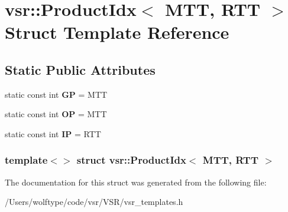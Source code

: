 \hypertarget{structvsr_1_1_product_idx_3_01_m_t_t_00_01_r_t_t_01_4}{\section{vsr\-:\-:Product\-Idx$<$ M\-T\-T, R\-T\-T $>$ Struct Template Reference}
\label{structvsr_1_1_product_idx_3_01_m_t_t_00_01_r_t_t_01_4}
}
\subsection*{Static Public Attributes}
\begin{DoxyCompactItemize}
\item 
\hypertarget{structvsr_1_1_product_idx_3_01_m_t_t_00_01_r_t_t_01_4_a96b1476a5137fb033fc050fc941b9f05}{static const int {\bfseries G\-P} = M\-T\-T}\label{structvsr_1_1_product_idx_3_01_m_t_t_00_01_r_t_t_01_4_a96b1476a5137fb033fc050fc941b9f05}

\item 
\hypertarget{structvsr_1_1_product_idx_3_01_m_t_t_00_01_r_t_t_01_4_a788326f3a55ff19b4fe8712c984b3bfd}{static const int {\bfseries O\-P} = M\-T\-T}\label{structvsr_1_1_product_idx_3_01_m_t_t_00_01_r_t_t_01_4_a788326f3a55ff19b4fe8712c984b3bfd}

\item 
\hypertarget{structvsr_1_1_product_idx_3_01_m_t_t_00_01_r_t_t_01_4_a2b36a0864453a645934032318d22d9e1}{static const int {\bfseries I\-P} = R\-T\-T}\label{structvsr_1_1_product_idx_3_01_m_t_t_00_01_r_t_t_01_4_a2b36a0864453a645934032318d22d9e1}

\end{DoxyCompactItemize}
\subsubsection*{template$<$$>$ struct vsr\-::\-Product\-Idx$<$ M\-T\-T, R\-T\-T $>$}



The documentation for this struct was generated from the following file\-:\begin{DoxyCompactItemize}
\item 
/\-Users/wolftype/code/vsr/\-V\-S\-R/vsr\-\_\-templates.\-h\end{DoxyCompactItemize}
